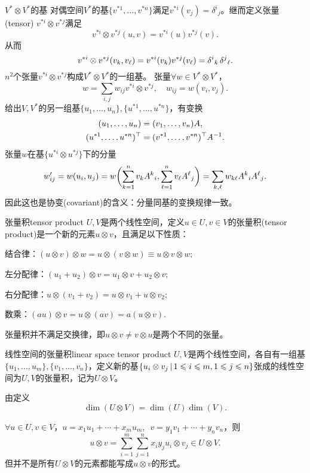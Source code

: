 \begin{example}{$V^\ast\otimes V^\ast$的基}{}
	对偶空间$V^\ast$的基$\{v^{\ast 1},\ldots,v^{\ast n}\}$满足$v^{\ast i}(v_j)=\delta^i{}_j$。继而定义张量(tensor) $v^{\ast i}\otimes v^{\ast j}$满足
	\[
		v^{\ast i}\otimes v^{\ast j}(u,v)=v^{\ast i}(u)v^{\ast j}(v).
	\]
	从而
	\[
		v^{\ast i}\otimes v^{\ast j}(v_k,v_\ell)=v^{\ast i}(v_k)v^{\ast j}(v_\ell)=\delta^i{}_k\mathop{}\!\delta^j{}_\ell.
	\]
	$n^2$个张量$v^{\ast i}\otimes v^{\ast j}$构成$V^\ast\otimes V^\ast$的一组基。
	\tcblower
	张量$\forall w\in V^\ast\otimes V^\ast$，
	\[
		w=\sum_{i,j}w_{ij}v^{\ast i}\otimes v^{\ast j},\quad w_{ij}=w(v_i,v_j).
	\]
	给出$V,V^\ast$的另一组基$\{u_1,\ldots,u_n\},\{u^{\ast 1},\ldots,u^{\ast n}\}$，有变换
	\begin{align*}
		(u_1,\ldots,u_n)&=(v_1,\ldots,v_n)A,\\
		(u^{\ast 1},\ldots,u^{\ast n})^\top&=(v^{\ast 1},\ldots,v^{\ast n})^\top A^{-1}.
	\end{align*}
	张量$w$在基$\{u^{\ast i}\otimes u^{\ast j}\}$下的分量
	\[
		w'_{ij}=w(u_i,u_j)=w\biggl(\sum_{k=1}^nv_kA^k{}_i,\sum_{\ell=1}^nv_\ell A^\ell{}_j\biggr)=\sum_{k,\ell}w_{k\ell}A^k{}_iA^\ell{}_j.
	\]
	因此这也是协变(covariant)的含义：分量同基的变换规律一致。
\end{example}
\begin{definition}{张量积}{tensor product}
	$U,V$是两个线性空间，定义$u\in U,v\in V$的张量积(tensor product)是一个新的元素$u\otimes v$，且满足以下性质：
	\begin{compactitem}
		\item 结合律：$(u\otimes v)\otimes w=u\otimes(v\otimes w)\equiv u\otimes v\otimes w;$
		\item 左分配律：$(u_1+u_2)\otimes v=u_1\otimes v+u_2\otimes v;$
		\item 右分配律：$u\otimes(v_1+v_2)=u\otimes v_1+u\otimes v_2;$
		\item 数乘：$(au)\otimes v=u\otimes(av)=a(u\otimes v).$
	\end{compactitem}
\end{definition}
张量积并不满足交换律，即$u\otimes v\neq v\otimes u$是两个不同的张量。
\begin{definition}{线性空间的张量积}{linear space tensor product}
	$U,V$是两个线性空间，各自有一组基$\{u_1,\ldots,u_m\},\{v_1,\ldots,v_n\}$，定义新的基$\left\{u_i\otimes v_j\,\middle\vert\,1\leqslant i\leqslant m,1\leqslant j\leqslant n\right\}$张成的线性空间为$U,V$的张量积，记为$U\otimes V$。
\end{definition}
由定义 
\[
	\dim(U\otimes V)=\dim(U)\dim(V).
\]
\begin{example}{}{}
	$\forall u\in U,v\in V$，$u=x_1u_1+\cdots+x_mu_m,\enspace v=y_1v_1+\cdots+y_nv_n$，则 
	\[
		u\otimes v=\sum_{i=1}^m\sum_{j=1}^nx_iy_ju_i\otimes v_j\in U\otimes V.
	\]
	但并不是所有$U\otimes V$的元素都能写成$u\otimes v$的形式。
\end{example}
